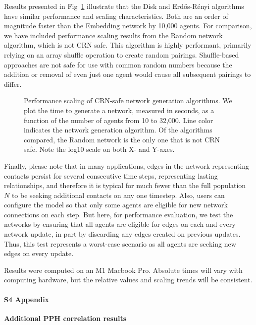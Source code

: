 \documentclass[10pt,letterpaper]{article}
\newcommand{\er}{Erd{\H o}s-R{\'e}nyi }
\begin{document}
Results presented in Fig~\ref{f:net_perf} illustrate that the Disk and \er algorithms have similar performance and scaling characteristics. Both are an order of magnitude faster than the Embedding network by 10,000 agents. For comparison, we have included performance scaling results from the Random network algorithm, which is not CRN safe. This algorithm is highly performant, primarily relying on an array shuffle operation to create random pairings. Shuffle-based approaches are not safe for use with common random numbers because the addition or removal of even just one agent would cause all subsequent pairings to differ.
\begin{figure}[t!]
\centering
\caption{Performance scaling of CRN-safe network generation algorithms. We plot the time to generate a network, measured in seconds, as a function of the number of agents from 10 to 32,000. Line color indicates the network generation algorithm. Of the algorithms compared, the Random network is the only one that is not CRN safe. Note the log10 scale on both X- and Y-axes.}
\label{f:net_perf}
\end{figure}

Finally, please note that in many applications, edges in the network representing contacts persist for several consecutive time steps, representing lasting relationships, and therefore it is typical for much fewer than the full population $N$ to be seeking additional contacts on any one timestep. Also, users can configure the model so that only some agents are eligible for new network connections on each step. But here, for performance evaluation, we test the networks by ensuring that all agents are eligible for edges on each and every network update, in part by discarding any edges created on previous updates. Thus, this test represents a worst-case scenario as all agents are seeking new edges on every update.

Results were computed on an M1 Macbook Pro. Absolute times will vary with computing hardware, but the relative values and scaling trends will be consistent.



\paragraph*{S4 Appendix}\label{a:PPHcor}
{\bf Additional PPH correlation results}
\end{document}
